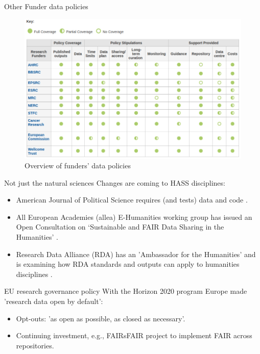 \documentclass[aspectratio=169, 11pt]{beamer} %
\begin{document}
\begin{frame}{Other Funder data policies}
  \begin{figure}[H]
    \centering
        \includegraphics[height=.7\textheight]{figures/DCC-Funders.png}
        \caption{Overview of funders' data policies \cite{Dcc2019-jn}}
        \label{fig:Dcc2018}
  \end{figure}
\end{frame}

\begin{frame}{Not just the natural sciences}
  Changes are coming to HASS disciplines:
    \begin{itemize}[label=\textbullet]
        \item American Journal of Political Science requires (and tests) data and code \cite{Jacoby2017-lw, Ajps2015-ex}.
        \item All European Academies (allea) E-Humanities working group \cite{Allea2019-wy} has issued an Open Consultation on `Sustainable and FAIR Data Sharing in the Humanities' \cite{Allea2019-aw}.
        \item Research Data Alliance (RDA) has an 'Ambassador for the Humanities' and is examining how RDA standards and outputs can apply to humanities disciplines \cite{Rda2019-wc}.
    \end{itemize}
\end{frame}

\begin{frame}{EU research governance policy}
  With the Horizon 2020 program \cite{European_Commission2019-an} Europe made 'research data open by default':
    \begin{itemize}[label=\textbullet]
        \item Opt-outs: 'as open as possible, as closed as necessary'.
        \item Continuing investment, e.g., FAIRsFAIR project \cite{Knaw-dans2019-sv} to implement FAIR across repositories.
    \end{itemize}
\end{frame}
\end{document}
